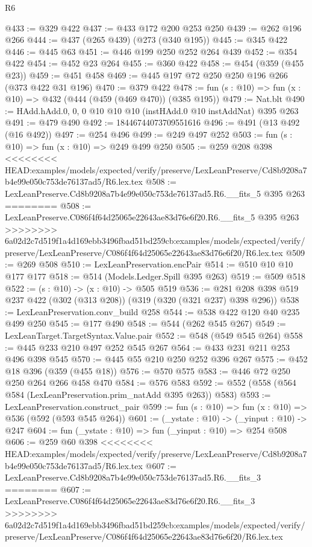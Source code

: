 \begin{lexlean}{R6}
\begin{coremodule}
{{{{{{{{{{{{{{{@433 := @329 @422
@437 := @433 @172 @200 @253 @250
@439 := @262 @196 @266
@444 := @437 (@265 @439) (@273 (@340 @195))
@445 := @345 @422
@446 := @445 @63
@451 := @446 @199 @250 @252 @264 @439
@452 := @354 @422
@454 := @452 @23 @264
@455 := @360 @422
@458 := @454 (@359 (@455 @23))
@459 := @451 @458
@469 := @445 @197 @72 @250 @250 @196 @266 (@373 @422 @31 @196)
@470 := @379 @422
@478 := fun (s : @10) => fun (x : @10) => @432 (@444 (@459 (@469 @470)) (@385 @195))
@479 := Nat.blt
@490 := HAdd.hAdd.{0, 0, 0} @10 @10 @10 (instHAdd.{0} @10 instAddNat) @395 @263
@491 := @479 @490
@492 := 18446744073709551616
@496 := @491 (@13 @492 (@16 @492))
@497 := @254 @496
@499 := @249 @497 @252
@503 := fun (s : @10) => fun (x : @10) => @249 @499 @250
@505 := @259 @208 @398
<<<<<<<< HEAD:examples/models/expected/verify/preserve/LexLeanPreserve/Cd8b9208a7b4e99e050c753de76137ad5/R6.lex.tex
@508 := LexLeanPreserve.Cd8b9208a7b4e99e050c753de76137ad5.R6.__fits_5 @395 @263
========
@508 := LexLeanPreserve.C086f4f64d25065e22643ae83d76e6f20.R6.__fits_5 @395 @263
>>>>>>>> 6a02d2c7d519f1a4d169ebb3496fbad51bd259cb:examples/models/expected/verify/preserve/LexLeanPreserve/C086f4f64d25065e22643ae83d76e6f20/R6.lex.tex
@509 := @269 @508
@510 := LexLeanPreservation.encPair
@514 := @510 @10 @10 @177 @177
@518 := @514 (Models.Ledger.Spill @395 @263)
@519 := @509 @518
@522 := (s : @10) -> (x : @10) -> @505 @519
@536 := @281 @208 @398 @519 @237 @422 (@302 (@313 @208)) (@319 (@320 (@321 @237) @398 @296))
@538 := LexLeanPreservation.conv_build @258
@544 := @538 @422 @120 @40 @235 @499 @250
@545 := @177 @490
@548 := @544 (@262 @545 @267)
@549 := LexLeanTarget.TargetSyntax.Value.pair
@552 := @548 (@549 @545 @264)
@558 := @445 @233 @210 @497 @252 @545 @267
@564 := @433 @231 @211 @253 @496 @398 @545
@570 := @445 @55 @210 @250 @252 @396 @267
@575 := @452 @18 @396 (@359 (@455 @18))
@576 := @570 @575
@583 := @446 @72 @250 @250 @264 @266 @458 @470
@584 := @576 @583
@592 := @552 (@558 (@564 @584 (LexLeanPreservation.prim_natAdd @395 @263)) @583)
@593 := LexLeanPreservation.construct_pair
@599 := fun (s : @10) => fun (x : @10) => @536 (@592 (@593 @545 @264))
@601 := (_ystate : @10) -> (_yinput : @10) -> @247
@604 := fun (_ystate : @10) => fun (_yinput : @10) => @254 @508
@606 := @259 @60 @398
<<<<<<<< HEAD:examples/models/expected/verify/preserve/LexLeanPreserve/Cd8b9208a7b4e99e050c753de76137ad5/R6.lex.tex
@607 := LexLeanPreserve.Cd8b9208a7b4e99e050c753de76137ad5.R6.__fits_3
========
@607 := LexLeanPreserve.C086f4f64d25065e22643ae83d76e6f20.R6.__fits_3
>>>>>>>> 6a02d2c7d519f1a4d169ebb3496fbad51bd259cb:examples/models/expected/verify/preserve/LexLeanPreserve/C086f4f64d25065e22643ae83d76e6f20/R6.lex.tex
}}}}}}}}}}}}}}}
\end{coremodule}
\end{lexlean}
